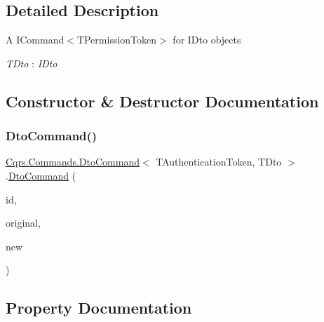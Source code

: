 \subsection{Detailed Description}
A I\+Command$<$\+T\+Permission\+Token$>$ for I\+Dto objects 

\begin{Desc}
\item[Type Constraints]\begin{description}
\item[{\em T\+Dto} : {\em I\+Dto}]\end{description}
\end{Desc}


\subsection{Constructor \& Destructor Documentation}
\mbox{\label{classCqrs_1_1Commands_1_1DtoCommand_a705b7bdee6a242dd56821c60b4040b23}} 
\subsubsection{\texorpdfstring{Dto\+Command()}{DtoCommand()}}
{\footnotesize\ttfamily \hyperlink{classCqrs_1_1Commands_1_1DtoCommand}{Cqrs.\+Commands.\+Dto\+Command}$<$ T\+Authentication\+Token, T\+Dto $>$.\hyperlink{classCqrs_1_1Commands_1_1DtoCommand}{Dto\+Command} (\begin{DoxyParamCaption}\item[{Guid}]{id,  }\item[{T\+Dto}]{original,  }\item[{T\+Dto @}]{new }\end{DoxyParamCaption})}



\subsection{Property Documentation}
\mbox{\label{classCqrs_1_1Commands_1_1DtoCommand_aedf535bfbf04e3532c90e69548b85c32}} 
